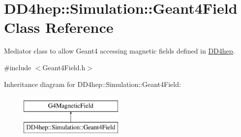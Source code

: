 \hypertarget{class_d_d4hep_1_1_simulation_1_1_geant4_field}{}\section{D\+D4hep\+:\+:Simulation\+:\+:Geant4\+Field Class Reference}
\label{class_d_d4hep_1_1_simulation_1_1_geant4_field}


Mediator class to allow Geant4 accessing magnetic fields defined in \hyperlink{namespace_d_d4hep}{D\+D4hep}.  




{\ttfamily \#include $<$Geant4\+Field.\+h$>$}

Inheritance diagram for D\+D4hep\+:\+:Simulation\+:\+:Geant4\+Field\+:\begin{figure}[H]
\begin{center}
\leavevmode
\includegraphics[height=2.000000cm]{class_d_d4hep_1_1_simulation_1_1_geant4_field}
\end{center}
\end{figure}
